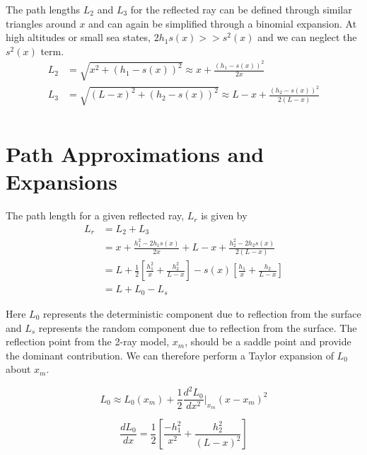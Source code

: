 The path lengths  $L_2$ and $L_3$ for the reflected ray can be defined through similar triangles around $x$ and can again be simplified through a binomial expansion. At high altitudes or small sea states, $2h_1s(x) >> s^2(x)$ and we can neglect the $s^2(x)$ term.
\begin{equation}
\begin{aligned}
L_2 &= \sqrt{x^2 + \left( h_1 - s(x)\right)^2}  \approx x + \frac{(h_1-s(x))^2}{2x}\\
L_3 & = \sqrt{\left(L - x\right)^2 + \left( h_2 - s(x)\right)^2}  \approx L-x + \frac{(h_2 - s(x))^2}{2\left(L-x\right)}\\
\end{aligned}
\label{mp_eq:12}
\end{equation}
\renewcommand{\baselinestretch}{2} \small\normalsize

\section{Path Approximations and Expansions}
The path length for a given reflected ray, $L_r$ is given by
\begin{equation}
\begin{aligned}
L_r &= L_2 + L_3 \\
& = x + \frac{h_1^2-2h_1s(x)}{2x} +  L-x + \frac{h_2^2 - 2h_2s(x)}{2\left(L-x\right)} \\
& = L + \frac{1}{2}\left[\frac{h_1^2}{x} + \frac{h_2^2}{L-x} \right] - s(x)\left[ \frac{h_1}{x} + \frac{h_2}{L-x}\right] \\
&= L + L_0 - L_s
\end{aligned}
\label{mp_eq:13}
\end{equation}
\renewcommand{\baselinestretch}{2} \small\normalsize

Here $L_0$ represents the deterministic component due to reflection from the surface and $L_s$ represents the random component due to reflection from the surface. The reflection point from the 2-ray model, $x_m$, should be a saddle point and provide the dominant contribution. We can therefore perform a Taylor expansion of $L_0$ about $x_m$.

\begin{equation}
L_0 \approx L_0(x_m) + \frac{1}{2}\frac{d^2L_0}{dx^2}\bigg|_{x_m}(x-x_m)^2
\label{mp_eq:14}
\end{equation}

\begin{equation}
\frac{dL_0}{dx} = \frac{1}{2}\left[\frac{-h_1^2}{x^2} + \frac{h_2^2}{(L-x)^2} \right]
\label{mp_eq:15}
\end{equation}

